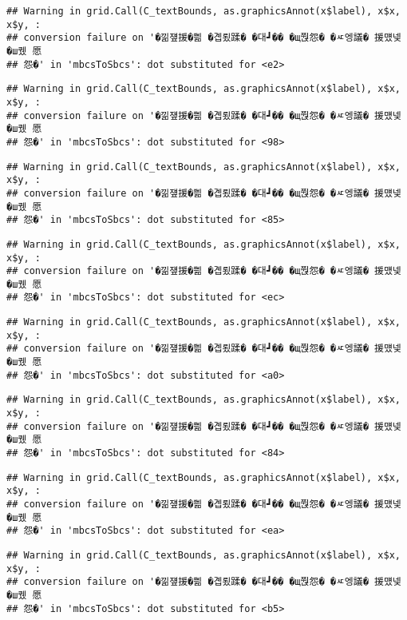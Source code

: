 \documentclass[
]{article}
\begin{document}
\begin{verbatim}
## Warning in grid.Call(C_textBounds, as.graphicsAnnot(x$label), x$x, x$y, :
## conversion failure on '�낆쟾援�쁾 �곕룄蹂� �대┛�� �щ쭩怨� �ㅼ엥議� 援먰넻�ш퀬 愿
## 怨�' in 'mbcsToSbcs': dot substituted for <e2>
\end{verbatim}

\begin{verbatim}
## Warning in grid.Call(C_textBounds, as.graphicsAnnot(x$label), x$x, x$y, :
## conversion failure on '�낆쟾援�쁾 �곕룄蹂� �대┛�� �щ쭩怨� �ㅼ엥議� 援먰넻�ш퀬 愿
## 怨�' in 'mbcsToSbcs': dot substituted for <98>
\end{verbatim}

\begin{verbatim}
## Warning in grid.Call(C_textBounds, as.graphicsAnnot(x$label), x$x, x$y, :
## conversion failure on '�낆쟾援�쁾 �곕룄蹂� �대┛�� �щ쭩怨� �ㅼ엥議� 援먰넻�ш퀬 愿
## 怨�' in 'mbcsToSbcs': dot substituted for <85>
\end{verbatim}

\begin{verbatim}
## Warning in grid.Call(C_textBounds, as.graphicsAnnot(x$label), x$x, x$y, :
## conversion failure on '�낆쟾援�쁾 �곕룄蹂� �대┛�� �щ쭩怨� �ㅼ엥議� 援먰넻�ш퀬 愿
## 怨�' in 'mbcsToSbcs': dot substituted for <ec>
\end{verbatim}

\begin{verbatim}
## Warning in grid.Call(C_textBounds, as.graphicsAnnot(x$label), x$x, x$y, :
## conversion failure on '�낆쟾援�쁾 �곕룄蹂� �대┛�� �щ쭩怨� �ㅼ엥議� 援먰넻�ш퀬 愿
## 怨�' in 'mbcsToSbcs': dot substituted for <a0>
\end{verbatim}

\begin{verbatim}
## Warning in grid.Call(C_textBounds, as.graphicsAnnot(x$label), x$x, x$y, :
## conversion failure on '�낆쟾援�쁾 �곕룄蹂� �대┛�� �щ쭩怨� �ㅼ엥議� 援먰넻�ш퀬 愿
## 怨�' in 'mbcsToSbcs': dot substituted for <84>
\end{verbatim}

\begin{verbatim}
## Warning in grid.Call(C_textBounds, as.graphicsAnnot(x$label), x$x, x$y, :
## conversion failure on '�낆쟾援�쁾 �곕룄蹂� �대┛�� �щ쭩怨� �ㅼ엥議� 援먰넻�ш퀬 愿
## 怨�' in 'mbcsToSbcs': dot substituted for <ea>
\end{verbatim}

\begin{verbatim}
## Warning in grid.Call(C_textBounds, as.graphicsAnnot(x$label), x$x, x$y, :
## conversion failure on '�낆쟾援�쁾 �곕룄蹂� �대┛�� �щ쭩怨� �ㅼ엥議� 援먰넻�ш퀬 愿
## 怨�' in 'mbcsToSbcs': dot substituted for <b5>
\end{verbatim}
\end{document}
